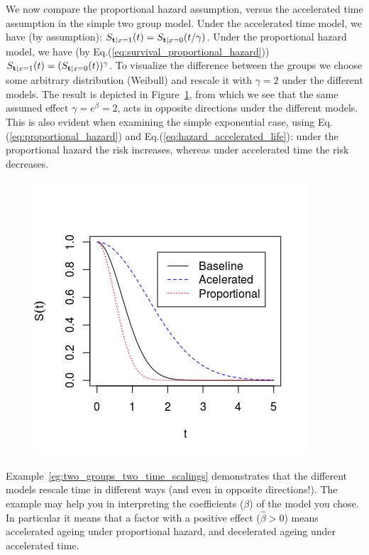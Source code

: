 \begin{example}
\label{eg:two_groups_two_time_scalings}
We now compare the proportional hazard assumption, versus the accelerated time assumption in the simple two group model. 
Under the accelerated time model, we have (by assumption):
$S_{\mathbf{t}|x=1} (t) = S_{\mathbf{t}|x = 0} (t/\gamma)$. 
Under the proportional hazard model, we have (by Eq.(\ref{eq:survival_proportional_hazard})) 
$	S_{\mathbf{t}|x=1} (t)=(S_{\mathbf{t}|x=0} (t))^{\gamma}$.
To visualize the difference between the groups we choose some arbitrary distribution (Weibull) and rescale it with $\gamma=2$ under the different models. 
The result is depicted in Figure~\ref{fig:time_rescaling}, from which we see that the same assumed effect $\gamma=e^\beta=2$, acts in opposite directions under the different models. 
This is also evident when examining the simple exponential case, using Eq.(\ref{eq:proportional_hazard}) and Eq.(\ref{eq:hazard_accelerated_life}): under the proportional hazard the risk increases, whereas under accelerated time the risk decreases.

\begin{figure}[ht]
\centering
\includegraphics[height=0.3\textheight]{art/survivals}
\caption{}
\label{fig:time_rescaling}
\end{figure}
\end{example}
Example~\ref{eg:two_groups_two_time_scalings}  demonstrates that the different models rescale time in different ways (and even in opposite directions!). 
The example may help you in interpreting the coefficients ($\beta$) of the model you chose. 
In particular it means that a factor with a positive effect ($\hat{\beta}>0$) means accelerated ageing under proportional hazard, and decelerated ageing under accelerated time.


